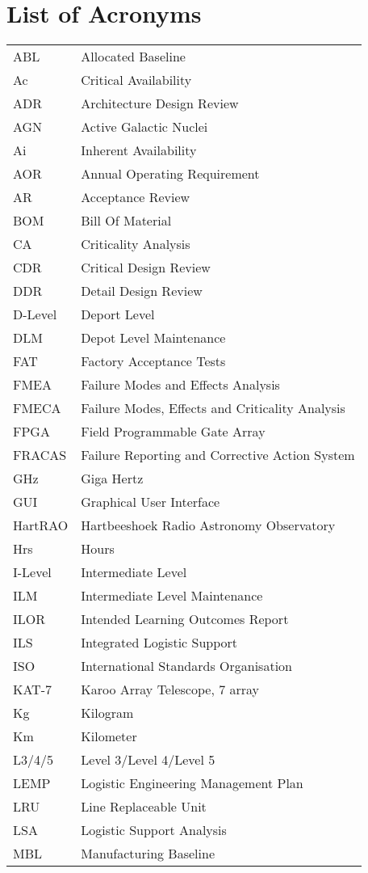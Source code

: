 



	
	\chapter*{List of Acronyms}
	
	\setlength{\LTleft}{0pt}
	
	\begin{longtable}{@{}ll@{}}
		ABL	&	Allocated Baseline	\\
		Ac	&	Critical Availability	\\
		ADR	&	Architecture Design Review	\\
		AGN	&	Active Galactic Nuclei	\\
		Ai	&	Inherent Availability	\\
		AOR	&	Annual Operating Requirement	\\
		AR	&	Acceptance Review	\\
		BOM	&	Bill Of Material	\\
		CA	&	Criticality Analysis	\\
		CDR	&	Critical Design Review	\\
		DDR	&	Detail Design Review	\\
		D-Level	&	Deport Level	\\
		DLM	&	Depot Level Maintenance	\\
		FAT	&	Factory Acceptance Tests	\\
		FMEA	&	Failure Modes and Effects Analysis	\\
		FMECA	&	Failure Modes, Effects and Criticality Analysis	\\
		FPGA	&	Field Programmable Gate Array	\\
		FRACAS	&	Failure Reporting and Corrective Action System	\\
		GHz	&	Giga Hertz	\\
		GUI	&	Graphical User Interface	\\
		HartRAO	&	Hartbeeshoek Radio Astronomy Observatory	\\
		Hrs	&	Hours	\\
		I-Level	&	Intermediate Level	\\
		ILM	&	Intermediate Level Maintenance	\\
		ILOR	&	Intended Learning Outcomes Report	\\
		ILS	&	Integrated Logistic Support	\\
		ISO	&	International Standards Organisation	\\
		KAT-7	&	Karoo Array Telescope, 7 array	\\
		Kg	&	Kilogram	\\
		Km	&	Kilometer	\\
		L3/4/5	&	Level 3/Level 4/Level 5	\\
		LEMP	&	Logistic Engineering Management Plan	\\
		LRU	&	Line Replaceable Unit	\\
		LSA	&	Logistic Support Analysis	\\
		MBL	&	Manufacturing Baseline	\\
		

\end{longtable}
